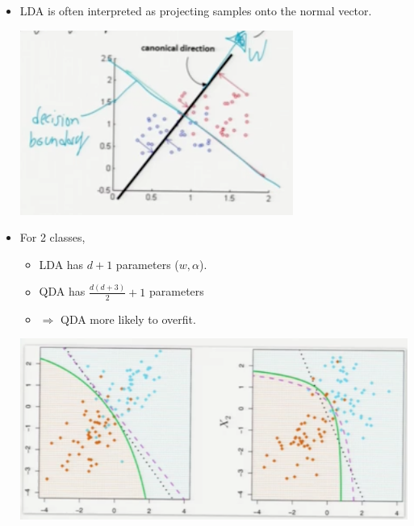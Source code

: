 \documentclass[10pt]{article}
\begin{document}
\begin{itemize}
\begin{itemize}
						\item LDA is often interpreted as projecting samples onto the normal vector.
							\begin{center}
								\includegraphics[scale=0.5]{../images/lda_projections}
							\end{center}
						\item For 2 classes,
							\begin{itemize}
								\item LDA has $d + 1$ parameters ($w, \alpha$).
								\item QDA has $\frac{d(d+3)}{2} + 1$ parameters
								\item $\Rightarrow$ QDA more likely to overfit.
							\end{itemize}
							\begin{center}
								\includegraphics[scale=0.5]{../images/overfitting}
							\end{center}
					\end{itemize}
			\end{itemize}
\end{document}

